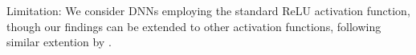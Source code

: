 Limitation: We consider DNNs employing the standard ReLU activation function, though our findings can be extended to other activation functions, following similar extention by \cite{DivideAndSlide}. 




%   
% 
%
%
%
%
